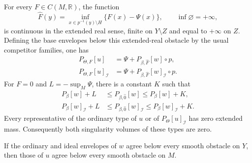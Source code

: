 \begin{proposition}\label{prop:fibration-obstacle-reduction}
For every $F\in C(M,\mathbb R)$, the function
\[
 \widehat F(y)=\inf_{x\in p^{-1}(y)\setminus H}\{F(x)-\Psi(x)\},
 \qquad\inf\varnothing=+\infty,
\]
is continuous in the extended real sense, finite on $Y\setminus Z$ and equal to $+\infty$ on $Z$. Defining the base envelopes below this extended-real obstacle by the usual competitor families, one has
\begin{equation}\label{eq:fibration-obstacle-reduction}
 \begin{split}
 P_{\Theta,F}[u]&=\Psi+P_{\beta,\widehat F}[w]\circ p,\\
 P_{\Theta,F}[u]_{\mathcal I}
     &=\Psi+P_{\beta,\widehat F}[w]_{\mathcal I}\circ p.
 \end{split}
\end{equation}
For $F=0$ and $L=-\sup_M\Psi$, there is a constant $K$ such that
\begin{equation}\label{eq:fibration-zero-obstacle-bounds}
 \begin{split}
 P_\beta[w]+L&\leq P_{\beta,\widehat 0}[w]\leq P_\beta[w]+K,\\
 P_\beta[w]_{\mathcal I}+L&\leq P_{\beta,\widehat 0}[w]_{\mathcal I}
       \leq P_\beta[w]_{\mathcal I}+K.
 \end{split}
\end{equation}
Every representative of the ordinary type of $u$ or of $P_\Theta[u]_{\mathcal I}$ has zero extended mass. Consequently both singularity volumes of these types are zero.

If the ordinary and ideal envelopes of $w$ agree below every smooth obstacle on $Y$, then those of $u$ agree below every smooth obstacle on $M$.
\end{proposition}
